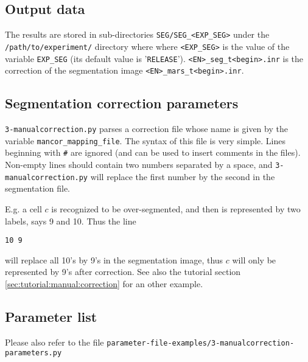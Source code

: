\subsection{Output data}

The results are stored in sub-directories
\texttt{SEG/SEG\_<EXP\_SEG>} under the
\texttt{/path/to/experiment/} directory where where \texttt{<EXP\_SEG>} is the value of the variable \texttt{EXP\_SEG} (its
default value is '\texttt{RELEASE}').
\texttt{<EN>\_seg\_t<begin>.inr} is the correction of the segmentation image \texttt{<EN>\_mars\_t<begin>.inr}.


\subsection{Segmentation correction parameters}

\texttt{3-manualcorrection.py} parses a correction file whose name is given by the variable \texttt{mancor\_mapping\_file}. The syntax of this file is very simple. Lines beginning with \texttt{\#} are ignored (and can be used to insert comments in the files). Non-empty lines should contain two numbers separated by a space, and \texttt{3-manualcorrection.py} will replace the first number by the second in the segmentation file.

E.g. a cell $c$ is recognized to be over-segmented, and then is represented by two labels, says 9 and 10. Thus the line
\begin{framed}
\begin{verbatim}
10 9
\end{verbatim}
\end{framed}
will replace all 10's by 9's in the segmentation image,  thus $c$ will only be represented by 9's after correction. See also the tutorial section \ref{sec:tutorial:manual:correction} for an other example.

\subsection{Parameter list}

Please also refer to the file
\texttt{parameter-file-examples/3-manualcorrection-parameters.py}

